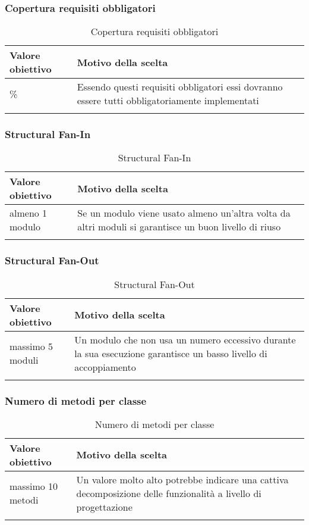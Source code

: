 \documentclass[../PianoDiQualifica.tex]{subfiles}
\begin{document}
		\subsubsection{Copertura requisiti obbligatori}
			\begin{longtable}[c] { >{\centering\arraybackslash}p{4cm} p{7cm} }
				\toprule
				\centerline{\textbf{Valore obiettivo}} & \centerline{\textbf{Motivo della scelta}} \\
				\midrule
					100\% &	Essendo questi requisiti obbligatori essi dovranno essere tutti obbligatoriamente implementati \\
				\bottomrule
				\caption{Copertura requisiti obbligatori}
			\end{longtable}
			
		\subsubsection{Structural Fan-In}
			\begin{longtable}[c] { >{\centering\arraybackslash}p{4cm} p{7cm} }
				\toprule
				\centerline{\textbf{Valore obiettivo}} & \centerline{\textbf{Motivo della scelta}} \\
				\midrule
					almeno 1 modulo &	Se un modulo viene usato almeno un'altra volta da altri moduli si garantisce un buon livello di riuso  \\
				\bottomrule
				\caption{Structural Fan-In}
			\end{longtable}
		
		\subsubsection{Structural Fan-Out}
			\begin{longtable}[c] { >{\centering\arraybackslash}p{4cm} p{7cm} }
				\toprule
				\centerline{\textbf{Valore obiettivo}} & \centerline{\textbf{Motivo della scelta}} \\
				\midrule
					massimo 5 moduli &	Un modulo che non usa un numero eccessivo durante la sua esecuzione garantisce un basso livello di accoppiamento \\
				\bottomrule
				\caption{Structural Fan-Out}
			\end{longtable}
		
		\subsubsection{Numero di metodi per classe}
			\begin{longtable}[c] { >{\centering\arraybackslash}p{4cm} p{7cm} }
				\toprule
				\centerline{\textbf{Valore obiettivo}} & \centerline{\textbf{Motivo della scelta}} \\
				\midrule
					massimo 10 metodi & Un valore molto alto potrebbe indicare una cattiva decomposizione delle funzionalità a livello di progettazione \\
				\bottomrule
				\caption{Numero di metodi per classe}
			\end{longtable}
			
\end{document}
